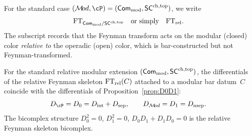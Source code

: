 \begin{remark}
\label{rem:rft-notation}
For the standard case $(\cM\!od, \cP) = (\Com_{\mathrm{mod}},
\SCchtop)$, we write
\[
\mathrm{FT}_{\mathsf{Com}_{\mathrm{mod}} / \mathsf{SC}^{\mathrm{ch,top}}}
\quad\text{or simply}\quad
\mathrm{FT}_{\mathrm{rel}}.
\]
The subscript records that the Feynman transform acts on the
modular (closed) color \emph{relative to} the operadic (open)
color, which is bar-constructed but not Feynman-transformed.
\end{remark}

\begin{proposition}
\label{prop:rft-differential-identification}
For the standard relative modular extension
$(\mathsf{Com}_{\mathrm{mod}}, \mathsf{SC}^{\mathrm{ch,top}})$, the differentials of the
relative Feynman skeleton $\mathrm{FT}_{\mathrm{rel}}(C)$ attached to a
modular bar datum~$C$ coincide with the differentials of
Proposition~\textup{\ref{prop:D0D1}}:
\[
D_\cP = D_0 = D_{\mathrm{int}} + D_{\mathrm{sep}},
\qquad
D_{\cM\!od} = D_1 = D_{\mathrm{nsep}}.
\]
The bicomplex structure $D_0^2 = 0$, $D_1^2 = 0$,
$D_0 D_1 + D_1 D_0 = 0$ is the relative Feynman skeleton
bicomplex.
\end{proposition}

